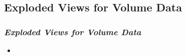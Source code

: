 \subsection{Exploded Views for Volume Data}
\begin{frame}\frametitle{\emph{Exploded Views for Volume Data} \cite{1187828}} 
\begin{itemize}
	\item 
\end{itemize}	
\end{frame}